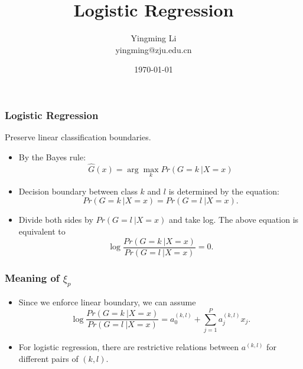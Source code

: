 \documentclass[12pt,notes,mathserif]{beamer}
\title[]{\LARGE Logistic Regression
}
\author[YingmingLi]{Yingming Li \\ yingming@zju.edu.cn}
\institute[DSERC, ZJU]{Data Science \& Engineering Research Center, ZJU}
\date[\today]{\today}
\begin{document}

\begin{frame}[c]
	\titlepage
\end{frame}

\begin{frame}[c]
	\frametitle{Logistic Regression}
	Preserve linear classification boundaries.
	\begin{itemize}
		\item  By the Bayes rule:
		      \begin{equation*}
			      \hat{G}(x)=\arg\max\limits_{k} Pr(G=k~|X=x)
		      \end{equation*}
		\item  Decision boundary between class $k$ and $l$ is determined by the equation:
		      \begin{equation*}
			      Pr(G=k~|X=x)=Pr(G=l~|X=x).
		      \end{equation*}
		\item  Divide both sides by $Pr(G = l~| X = x)$ and take log. The
		      above equation is equivalent to
		      \begin{equation*}
			      \log \dfrac{Pr(G=k~|X=x)}{Pr(G=l~|X=x)}=0.
		      \end{equation*}
	\end{itemize}
\end{frame}

\begin{frame}[c]
	\frametitle{Meaning of $\xi_p$}
	\begin{itemize}
		\item
		      Since we enforce linear boundary, we can assume
		      \begin{equation*}
			      \log \dfrac{Pr(G=k~|X=x)}{Pr(G=l~|X=x)}=a_0^{(k,l)}+\sum\limits_{j=1}^{P}a_j^{(k,l)}x_j.
		      \end{equation*}
		\item
		      For logistic regression, there are restrictive relations between $a^{(k,l)}$ for different pairs of $(k,l)$.
	\end{itemize}
\end{frame}
\end{document}
